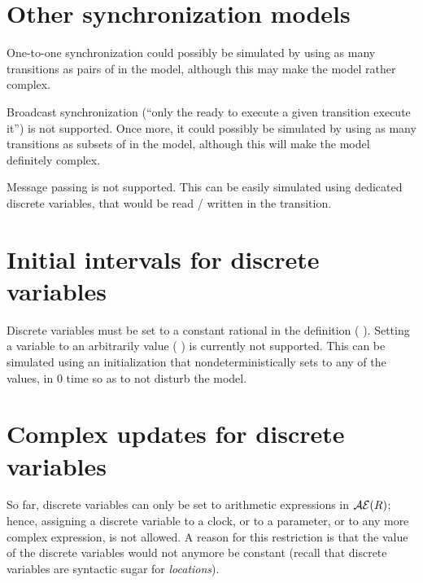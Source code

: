 \section{Other synchronization models}

One-to-one synchronization could possibly be simulated by using as many transitions as pairs of \IPTA{} in the model, although this may make the model rather complex.



Broadcast synchronization (``only the \IPTA{} ready to execute a given transition execute it'') is not supported.
Once more, it could possibly be simulated by using as many transitions as subsets of \IPTA{} in the model, although this will make the model definitely complex.



Message passing is not supported.
This can be easily simulated using dedicated discrete variables, that would be read / written in the transition.



\section{Initial intervals for discrete variables}

Discrete variables must be set to a constant rational in the  definition (\eg{} ).
Setting a variable to an arbitrarily value (\eg{} ) is currently not supported.
This can be simulated using an initialization \IPTA{} that nondeterministically sets  to any of the values, in 0 time so as to not disturb the model.


\section{Complex updates for discrete variables}

So far, discrete variables can only be set to arithmetic expressions in $\mathcal{AE}(R)$;
hence, assigning a discrete variable to a clock, or to a parameter, or to any more complex expression, is not allowed.
A reason for this restriction is that the value of the discrete variables would not anymore be constant (recall that discrete variables are syntactic sugar for \emph{locations}).

